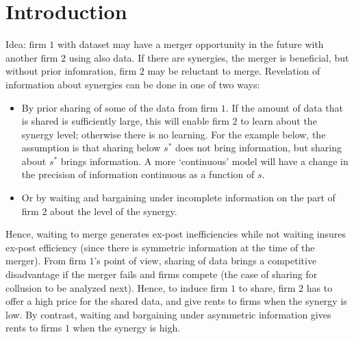 \documentclass[a4paper]{article}
\begin{document}
\section{Introduction}
Idea: firm $1$ with dataset may have a merger opportunity in the future with another firm $2$ using also data. If there are synergies, the merger is beneficial, but without prior infomration, firm $2$ may be reluctant to merge. Revelation of information about synergies can be done in one of two ways:
\begin{itemize}
  \item By prior sharing of some of the data from firm $1$. If the amount of data that is shared is sufficiently large, this will enable firm $2$ to learn about the synergy level; otherwise there is no learning. For the example below, the assumption is that sharing below $s^*$ does not bring information, but sharing about $s^*$ brings information. A more `continuous' model will have a change in the precision of information continuous as a function of $s$.
  \item Or by waiting and bargaining under incomplete information on the part of firm $2$ about the level of the synergy. 
\end{itemize}
Hence, waiting to merge generates ex-post inefficiencies while not waiting insures ex-post efficiency (since there is symmetric information at the time of the merger). From firm $1$'s point of view, sharing of data brings a competitive disadvantage if the merger fails and firms compete (the case of sharing for collusion to be analyzed next). Hence, to induce firm $1$ to share, firm $2$ has to offer a high price for the shared data, and give rents to firms when the synergy is low. By contrast, waiting and bargaining under asymmetric information gives rents to firms $1$ when the synergy is high.
\end{document}
